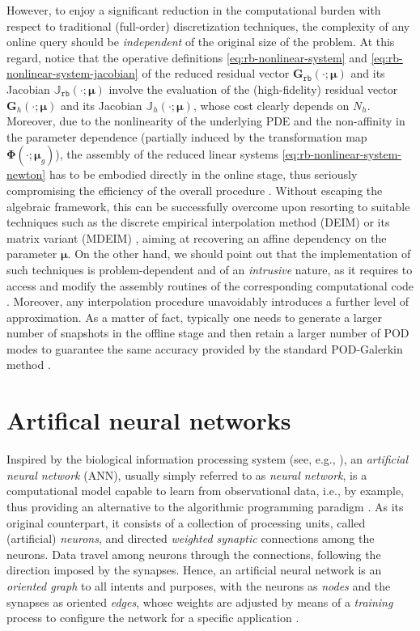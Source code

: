 \documentclass{elsarticle}
\numberwithin{equation}{section}
\theoremstyle{theorem}
\theoremstyle{definition}
\theoremstyle{remark}
\theoremstyle{proposition}
\numberwithin{figure}{section}
\newcommand{\bg}[1]{\boldsymbol{#1}}
\begin{document}
		However, to enjoy a significant reduction in the computational burden with respect to traditional (full-order) discretization techniques, the complexity of any online query should be \emph{independent} of the original size of the problem. At this regard, notice that the operative definitions \eqref{eq:rb-nonlinear-system} and \eqref{eq:rb-nonlinear-system-jacobian} of the reduced residual vector $\mathbf{G}_{\texttt{rb}}(\cdot; \bg{\mu})$ and its Jacobian $\mathbb{J}_{\texttt{rb}}(\cdot; \bg{\mu})$ involve the evaluation of the (high-fidelity) residual vector $\mathbf{G}_h(\cdot; \bg{\mu})$ and its Jacobian $\mathbb{J}_h(\cdot; \bg{\mu})$, whose cost clearly depends on ${N_h}$. Moreover, due to the nonlinearity of the underlying PDE and the non-affinity in the parameter dependence (partially induced by the transformation map $\bg{\Phi}(\cdot; \bg{\mu}_g)$), the assembly of the reduced linear systems \eqref{eq:rb-nonlinear-system-newton} has to be embodied directly in the online stage, thus seriously compromising the efficiency of the overall procedure \cite{Bar04}. Without escaping the algebraic framework, this can be successfully overcome upon resorting to suitable techniques such as the discrete empirical interpolation method (DEIM) \cite{Cha10} or its matrix variant (MDEIM) \cite{NMA15}, aiming at recovering an affine dependency on the parameter $\bg{\mu}$. On the other hand, we should point out that the implementation of such techniques is problem-dependent and of an \emph{intrusive} nature, as it requires to access and modify the assembly routines of the corresponding computational code \cite{Cas15}. Moreover, any interpolation procedure unavoidably introduces a further level of approximation. As a matter of fact, typically one needs to generate a larger number of snapshots in the offline stage and then retain a larger number of POD modes to guarantee the same accuracy provided by the standard POD-Galerkin method \cite{Bar04}.		
		
		
	
	\section{Artifical neural networks}
	\label{section:Artificial neural networks}
	
		Inspired by the biological information processing system (see, e.g., \cite{Hay05, Kri07}), an \emph{artificial neural network} (ANN), usually simply referred to as \emph{neural network}, is a computational model capable to learn from observational data, i.e., by example, thus providing an alternative to the algorithmic programming paradigm \cite{Nie15}. As its original counterpart, it consists of a collection of processing units, called (artificial) \emph{neurons}, and directed \emph{ weighted synaptic} connections among the neurons. Data travel among neurons through the connections, following the direction imposed by the synapses. Hence, an artificial neural network is an \emph{oriented graph} to all intents and purposes, with the neurons as \emph{nodes} and the synapses as oriented \emph{edges}, whose weights are adjusted by means of a \emph{training} process to configure the network for a specific application \cite{SD13}. 
		
\end{document}
